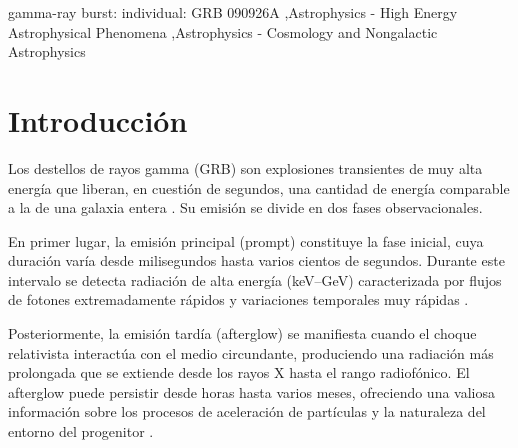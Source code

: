 \documentclass[final,5p,times,twocolumn,authoryear]{elsarticle}
\begin{document}
\begin{frontmatter}


\begin{keyword}
gamma-ray burst: individual: GRB 090926A \sep Astrophysics - High Energy Astrophysical Phenomena \sep Astrophysics - Cosmology and Nongalactic Astrophysics 





\end{keyword}


\end{frontmatter}




\section{Introducción}
\label{introduction}

Los destellos de rayos gamma (GRB) son explosiones transientes de muy alta energía que liberan, en cuestión de segundos, una cantidad de energía comparable a la de una galaxia entera \citep{kouveliotou1993,piran1999}.  Su emisión se divide en dos fases observacionales.

En primer lugar, la emisión principal (prompt) constituye la fase inicial, cuya duración varía desde milisegundos hasta varios cientos de segundos.  Durante este intervalo se detecta radiación de alta energía (keV–GeV) caracterizada por flujos de fotones extremadamente rápidos y variaciones temporales muy rápidas \citep{gehrels2009,ackermann2009}.

Posteriormente, la emisión tardía (afterglow) se manifiesta cuando el choque relativista interactúa con el medio circundante, produciendo una radiación más prolongada que se extiende desde los rayos X hasta el rango radiofónico.  El afterglow puede persistir desde horas hasta varios meses, ofreciendo una valiosa información sobre los procesos de aceleración de partículas y la naturaleza del entorno del progenitor \citep{vanparadijs2000,sari1998}.
\end{document}
